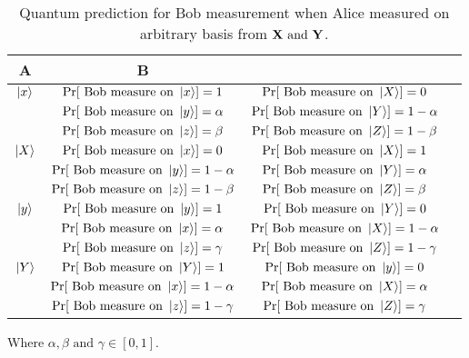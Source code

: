 \begin {table}[H]
\begin{center}\label{tabal1}
\begin{tabular}{ |c | c| c| c|}    
\hline
A&B\\
\hline
$\ket{x}$&$\Pr[\text{ Bob  measure on }\ket{x}] = 1$&$\Pr[\text{ Bob  measure on }\ket{X}] = 0$\\
\hline
&$\Pr[\text{ Bob  measure on } \ket{y}] = \alpha$&$\Pr[\text{ Bob  measure on } \ket{Y}]= 1-\alpha$\\
\hline
&$\Pr[\text{ Bob  measure on }\ket{z}] = \beta$&$\Pr[\text{ Bob  measure on }\ket{Z}] =  1-\beta$\\
\hline
$\ket{X}$&$\Pr[\text{ Bob  measure on }\ket{x}] = 0$&$\Pr[\text{ Bob  measure on }\ket{X}]= 1$\\
\hline
&$\Pr[\text{ Bob  measure on }\ket{y}] =1-\alpha$&$\Pr[\text{ Bob  measure on }\ket{Y}] = \alpha$\\
\hline
&$\Pr[\text{ Bob  measure on }\ket{z}] = 1-\beta $&$\Pr[\text{ Bob  measure on }\ket{Z}] = \beta$\\
\hline
$\ket{y}$&$\Pr[\text{ Bob  measure on }\ket{y}] = 1$&$\Pr[\text{ Bob  measure on }\ket{Y}] = 0$\\
\hline
&$\Pr[\text{ Bob  measure on }\ket{x}] = \alpha$&$ \Pr[\text{ Bob  measure on }\ket{X}]= 1-\alpha$\\
\hline
&$\Pr[\text{ Bob  measure on }\ket{z}] = \gamma$&$\Pr[\text{ Bob  measure on }\ket{Z}]= 1-\gamma$\\
\hline
$\ket{Y}$&$\Pr[\text{ Bob  measure on }\ket{Y}] = 1$&$\Pr[\text{ Bob  measure on }\ket{y}]= 0$\\
\hline
&$\Pr[\text{ Bob  measure on }\ket{x}] = 1-\alpha$&$\Pr[\text{ Bob  measure on }\ket{X}] = \alpha$\\
\hline
&$\Pr[\text{ Bob  measure on }\ket{z}]  = 1-\gamma$&$\Pr[\text{ Bob  measure on }\ket{Z}] = \gamma$\\
\hline
\end{tabular}
\caption {Quantum prediction for Bob measurement when Alice measured on arbitrary basis from $\bf{X} \text{ and } \bf{Y}$. }
\label{table:3}
\end{center}
\end{table}
Where $\alpha, \beta \text{ and } \gamma \in [0,1]$.





